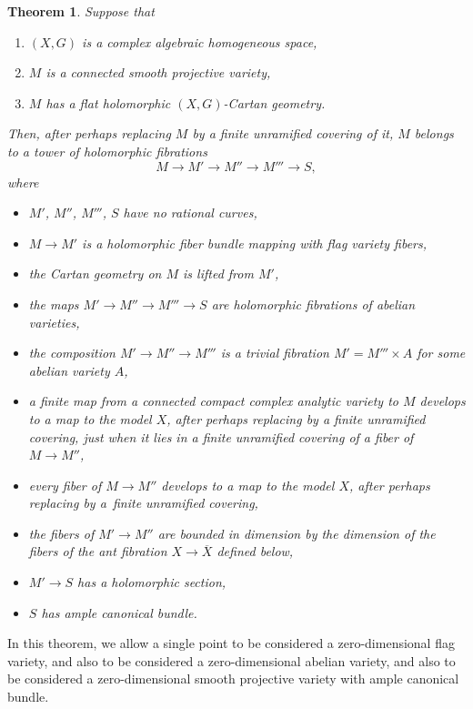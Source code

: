 \documentclass[10pt,a4paper]{amsart}
\numberwithin{equation}{section}
\newtheorem{Theorem}{Theorem}[section]
\begin{document}
\begin{Theorem}\label{theorem:main}
Suppose that
\begin{enumerate}\itemsep=0pt
\item[$(1)$]
$(X, G)$ is a complex algebraic homogeneous space,
\item[$(2)$]
$M$ is a connected smooth projective variety,
\item[$(3)$]
$M$ has a flat holomorphic $(X, G)$-Cartan geometry.
\end{enumerate}
Then, after perhaps replacing $M$ by a finite unramified covering of it, $M$ belongs to a tower of holomorphic fibrations
\[M\to M'\to M''\to M'''\to S,\] where
\begin{itemize}\itemsep=0pt
\item
$M'$, $M''$, $M'''$, $S$ have no rational curves,
\item
$M\to M'$ is a holomorphic fiber bundle mapping with flag variety fibers,
\item
the Cartan geometry on $M$ is lifted from $M'$,
\item
the maps $M'\to M'' \to M'''\to S$ are holomorphic fibrations of abelian varieties,
\item
the composition $M'\to M''\to M'''$ is a trivial fibration $M' = M'''\times A$ for some abelian
variety $A$,
\item
a finite map from a connected compact complex analytic variety to $M$ develops to a map to the model $X$, after perhaps replacing by a finite unramified covering, just when it lies in a finite unramified
covering of a fiber of $M\to M''$,
\item
every fiber of $M\to M''$ develops to a map to the model $X$, after perhaps replacing by a~finite unramified covering,
\item
the fibers of $M'\to M''$ are bounded in dimension by the dimension of the fibers of the ant fibration $X \longrightarrow
\overline{X}$ defined below,
\item
$M'\to S$ has a holomorphic section,
\item
$S$ has ample canonical bundle.
\end{itemize}
\end{Theorem}

In this theorem, we allow a single point to be considered a zero-dimensional flag variety, and also to be considered a zero-dimensional abelian variety, and also to be considered a zero-dimensional smooth projective variety with ample canonical bundle.
\end{document}
